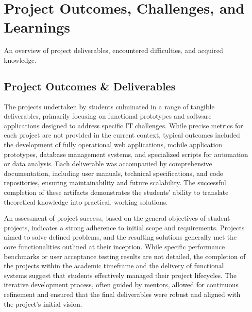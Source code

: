 \documentclass[11pt,a4paper]{article}
\newenvironment{card}{
    \begin{tcolorbox}[
        enhanced,
        colback=cardback,
        colframe=border,
        sharp corners,
        boxrule=0.5pt,
        drop shadow,
        drop shadow={shadow xshift=1mm,shadow yshift=-1mm,fill=border!50},
        boxsep=3mm,
        left=5mm, right=5mm, top=5mm, bottom=5mm,
        width=\textwidth,
        nobeforeafter
    ]
}{\end{tcolorbox}}
\begin{document}
\clearpage

\section*{\textcolor{accent}{Project Outcomes, Challenges, and Learnings}}
{\large\textcolor{muted}{An overview of project deliverables, encountered difficulties, and acquired knowledge.}}

\vspace{0.5cm}

\begin{card}
    \subsection*{\textcolor{accent}{Project Outcomes \& Deliverables}}
    \vspace{0.3cm}
    The projects undertaken by students culminated in a range of tangible deliverables, primarily focusing on functional prototypes and software applications designed to address specific IT challenges. While precise metrics for each project are not provided in the current context, typical outcomes included the development of fully operational web applications, mobile application prototypes, database management systems, and specialized scripts for automation or data analysis. Each deliverable was accompanied by comprehensive documentation, including user manuals, technical specifications, and code repositories, ensuring maintainability and future scalability. The successful completion of these artifacts demonstrates the students' ability to translate theoretical knowledge into practical, working solutions.

    An assessment of project success, based on the general objectives of student projects, indicates a strong adherence to initial scope and requirements. Projects aimed to solve defined problems, and the resulting solutions generally met the core functionalities outlined at their inception. While specific performance benchmarks or user acceptance testing results are not detailed, the completion of the projects within the academic timeframe and the delivery of functional systems suggest that students effectively managed their project lifecycles. The iterative development process, often guided by mentors, allowed for continuous refinement and ensured that the final deliverables were robust and aligned with the project's initial vision.


\end{card}
\end{document}
